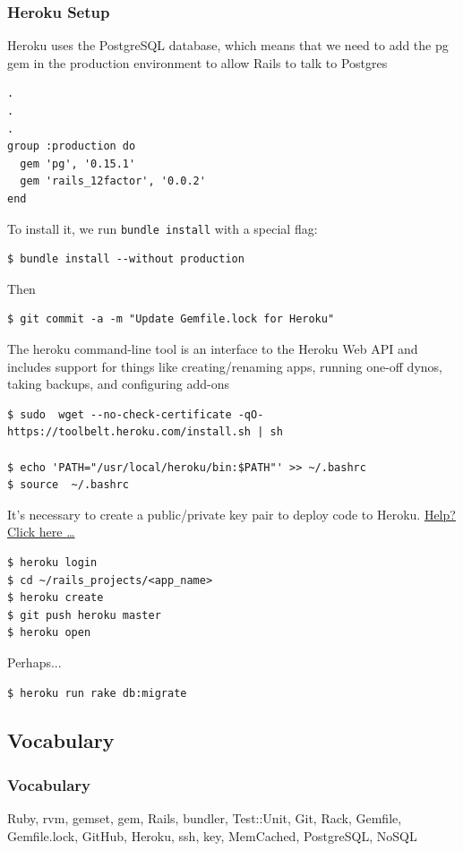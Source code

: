 \documentclass{beamer}
\newcommand{\commandinline}[1]{\lstinline[basicstyle=\small\lstfontfamily]{#1}}
\begin{document}
\begin{frame}
\frametitle{Heroku Setup} 
Heroku uses the PostgreSQL database, which means that we need to add the pg gem in the production environment to allow Rails to talk to Postgres
\lstset{language=ruby, style=eclipse}
\begin{lstlisting}
.
.
.
group :production do
  gem 'pg', '0.15.1'
  gem 'rails_12factor', '0.0.2'
end
\end{lstlisting}
To install it, we run \commandinline{bundle install} with a special flag:
\lstset{language=shell}
\begin{lstlisting}[escapechar=!]
$ bundle install --without production
\end{lstlisting}
Then 
\begin{lstlisting}[escapechar=!]
$ git commit -a -m "Update Gemfile.lock for Heroku"
\end{lstlisting}

The heroku command-line tool is an interface to the Heroku Web API and includes support for things like creating/renaming apps, running one-off dynos, taking backups, and configuring add-ons

\begin{lstlisting}[escapechar=!]
$ sudo  wget --no-check-certificate -qO- https://toolbelt.heroku.com/install.sh | sh

$ echo 'PATH="/usr/local/heroku/bin:$PATH"' >> ~/.bashrc
$ source  ~/.bashrc
\end{lstlisting}

It's necessary to create a public/private key pair to deploy code to Heroku. \href{https://devcenter.heroku.com/articles/keys}{\alert{Help? Click here \dots}}

\begin{lstlisting}[escapechar=!]
$ heroku login
$ cd ~/rails_projects/<app_name>
$ heroku create
$ git push heroku master
$ heroku open
\end{lstlisting}

Perhaps...
\begin{lstlisting}[escapechar=!]
$ heroku run rake db:migrate
\end{lstlisting}

\end{frame}

\subsection{Vocabulary}
\begin{frame}[fragile]
\frametitle{Vocabulary}
Ruby, rvm, gemset, gem, Rails, bundler, Test::Unit, Git, Rack, Gemfile, Gemfile.lock, GitHub, Heroku, ssh, key, MemCached, PostgreSQL, NoSQL
\end{frame}
\end{document}
